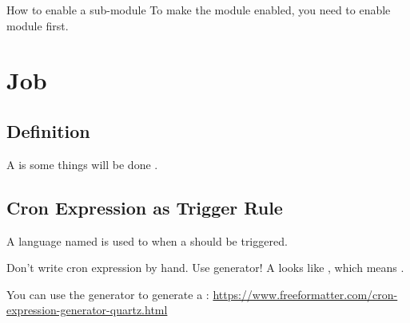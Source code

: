 \begin{example}{How to enable a sub-module}
    To make the module  enabled, you need to enable  module first.
\end{example}


\section{Job}\label{sec:job}

\subsection{Definition}
A  is some things will be done .

\subsection{Cron Expression as Trigger Rule}
A language named  is used to  when a  should be triggered.

\begin{tips}{Don't write cron expression by hand. Use generator!}
    A  looks like , which means .

    You can use the generator to generate a :
    \url{https://www.freeformatter.com/cron-expression-generator-quartz.html}
\end{tips}